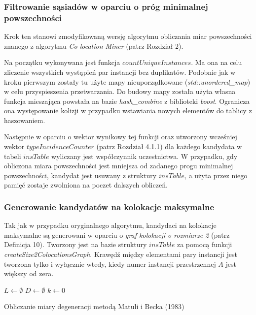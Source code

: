 \documentclass[12pt]{article}
\begin{document}
\subsubsection{Filtrowanie sąsiadów w oparciu o próg minimalnej powszechności}

Krok ten stanowi zmodyfikowaną wersję algorytmu obliczania miar powszechności znanego z algorytmu \textit{Co-location Miner} (patrz Rozdział 2).

Na początku wykonywana jest funkcja $ countUniqueInstances$. Ma ona na celu zliczenie wszystkich wystąpień par instancji bez duplikatów. Podobnie jak w kroku pierwszym zostały tu użyte mapy nieuporządkowane (\textit{std::unordered\_map}) w celu przyspieszenia przetwarzania. Do budowy mapy została użyta własna funkcja mieszająca powstała na bazie \textit{hash\_combine} z biblioteki \textit{boost}. Ogranicza ona występowanie kolizji w przypadku wstawiania nowych elementów do tablicy z haszowaniem.

Następnie w oparciu o wektor wynikowy tej funkcji oraz utworzony wcześniej wektor $ typeIncidenceCounter$ (patrz Rozdział 4.1.1) dla każdego kandydata w tabeli $ insTable $ wyliczany jest współczynnik uczestnictwa. W przypadku, gdy obliczona miara powszechności jest mniejsza od zadanego progu minimalnej powszechności, kandydat jest usuwany z struktury $ insTable $, a użyta przez niego pamięć zostaje zwolniona na poczet dalszych obliczeń.

\subsubsection{Generowanie kandydatów na kolokacje maksymalne}

Tak jak w przypadku oryginalnego algorytmu, kandydaci na kolokacje maksymalne są generowani w oparciu o \textit{graf kolokacji o rozmiarze 2} (patrz Definicja 10). Tworzony jest na bazie struktury $ insTable $ za pomocą funkcji \textit{createSize2ColocationsGraph}. Krawędź między elementami pary instancji jest tworzona tylko i wyłącznie wtedy, kiedy numer instancji przestrzennej $ A $ jest większy od zera. 

\begin{algorithm}
$L \leftarrow \emptyset$\; 
$D \leftarrow \emptyset$\;
$k \leftarrow 0$\;
\caption{Obliczanie miary degeneracji metodą Matuli i Becka (1983)}
\end{algorithm}
\end{document}
